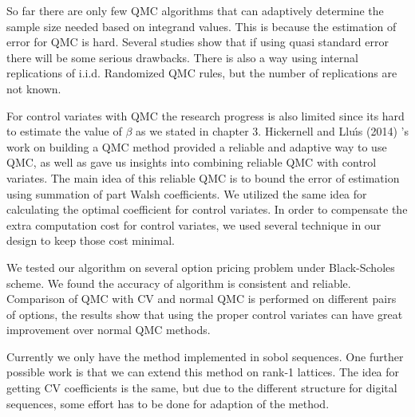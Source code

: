 
So far there are only few QMC algorithms that can adaptively determine the sample size needed based on integrand values. 
This is because the estimation of error for QMC is hard. 
Several studies show that if using quasi standard error there will be some serious drawbacks\cite{owen2006warnock}. 
There is also a way using internal replications of i.i.d. Randomized QMC rules, but the number of replications are not known\cite{hickernell2005control}.

For control variates with QMC the research progress is also limited since its hard to estimate the value of $\beta$ as we stated in chapter 3. 
Hickernell and Llu{\'\i}s (2014) \cite{hickernell2014reliable}'s work on building a QMC method provided a reliable and adaptive way to use QMC, as well as 
gave us insights into combining reliable QMC with control variates.    
The main idea of this reliable QMC is to bound the error of estimation using summation of part Walsh coefficients. 
We utilized the same idea for calculating the optimal coefficient for control variates.  
In order to compensate the extra computation cost for control variates, we used several technique in our design to keep those cost minimal.

We tested our algorithm on several option pricing problem under Black-Scholes scheme. We found the accuracy of algorithm is consistent and reliable. 
Comparison of QMC with CV and normal QMC is performed on different pairs of options, the results show that using the proper control variates can have great improvement over normal QMC methods.     


Currently we only have the method implemented in sobol sequences. 
One further possible work is that we can extend this method on rank-1 lattices\cite{rugama2014adaptive}. The idea for getting CV coefficients is the same, but due to the different structure for digital sequences, some effort has to be done for adaption of the method.
